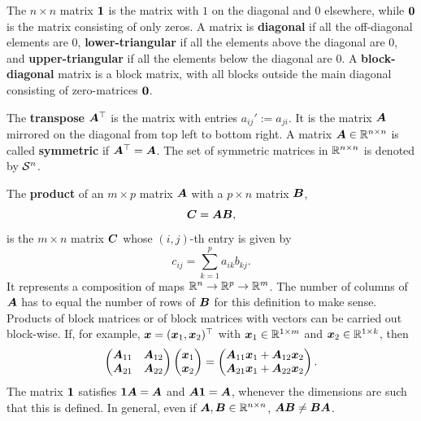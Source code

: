   The $n\times n$ matrix $\bm{1}$ is the matrix with $1$ on the diagonal and $0$ elsewhere, while $\bm{0}$ is the matrix consisting of only zeros. A matrix is \textbf{diagonal} if all the off-diagonal elements are $0$, \textbf{lower-triangular} if all the elements above the diagonal are $0$, and \textbf{upper-triangular} if all the elements below the diagonal are $0$. A \textbf{block-diagonal} matrix is a block matrix, with all blocks outside the main diagonal consisting of zero-matrices $\bm{0}$.
  
The \textbf{transpose} $\bm{A}^{\top}$ is the matrix with entries $a_{ij}':= a_{ji}$. It is the matrix $\bm{A}$ mirrored on the diagonal from top left to bottom right.
A matrix $\bm{A}\in \mathbb{R}^{n\times n}$ is called \textbf{symmetric} if $\bm{A}^{\top} = \bm{A}$. The set of symmetric matrices in $\mathbb{R}^{n\times n}$ is denoted  by $\mathcal{S}^n$.

The \textbf{product} of an $m\times p$ matrix $\bm{A}$ with a $p\times n$ matrix $\bm{B}$, 
\begin{equation*}
  \bm{C} = \bm{A} \bm{B},
\end{equation*}
is the $m\times n$ matrix $\bm{C}$ whose $(i,j)$-th entry is given by
\begin{equation*}
  c_{ij} = \sum_{k=1}^p a_{ik}b_{kj}. 
\end{equation*}
It represents a composition of maps $\mathbb{R}^n\to \mathbb{R}^p\to \mathbb{R}^m$.
The number of columns of $\bm{A}$ has to equal the number of rows of $\bm{B}$ for this definition to make sense. 
Products of block matrices or of block matrices with vectors can be carried out block-wise. If, for example, $\bm{x}=(\bm{x}_1,\bm{x}_2)^{\top}$ with $\bm{x}_1\in \mathbb{R}^{1\times m}$ and $\bm{x}_2\in \mathbb{R}^{1\times k}$, then
\begin{equation*}
\begin{pmatrix} 
  \bm{A}_{11} & \bm{A}_{12}\\
  \bm{A}_{21} & \bm{A}_{22}
 \end{pmatrix} 
 \begin{pmatrix}
 \bm{x}_1\\
 \bm{x}_2
 \end{pmatrix} = \begin{pmatrix}
 \bm{A}_{11}\bm{x}_1+\bm{A}_{12}\bm{x}_2\\
 \bm{A}_{21}\bm{x}_1+\bm{A}_{22}\bm{x}_2
 \end{pmatrix}.
\end{equation*}
The matrix $\bm{1}$ satisfies $\bm{1} \bm{A} = \bm{A}$ and $\bm{A} \bm{1} = \bm{A}$, whenever the dimensions are such that this is defined. In general, even if $\bm{A},\bm{B}\in \mathbb{R}^{n\times n}$, $\bm{A}\bm{B}\neq \bm{B}\bm{A}$.


